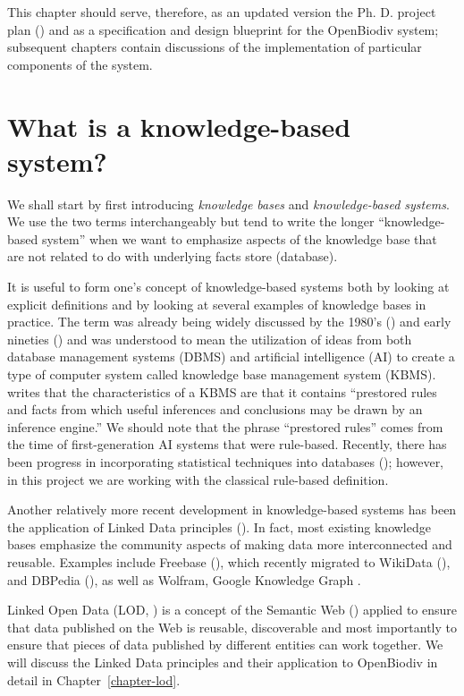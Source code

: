 This chapter should serve, therefore, as an updated version the Ph. D. project plan (\cite{senderov_open_2016}) and as a specification and design blueprint for the OpenBiodiv system; subsequent chapters contain discussions of the implementation of particular components of the system.

\section{What is a knowledge-based system?}

We shall start by first introducing \emph{knowledge bases} and \emph{knowledge-based systems}.  We use the two terms interchangeably but tend to write the longer  ``knowledge-based system'' when we want to emphasize aspects of the knowledge base that are not related to do with underlying facts store (database).

It is useful to form one's concept of knowledge-based systems both by looking at explicit definitions and by looking at several examples of knowledge bases in practice. The term was already being widely discussed by the 1980's (\cite{brodie_kbms_1989}) and early nineties (\cite{harris_knowledge_1993}) and was understood to mean the utilization of ideas from both database management systems (DBMS) and artificial intelligence (AI) to create a type of computer system called knowledge base management system (KBMS). \cite{harris_knowledge_1993} writes that the characteristics of a KBMS are that it contains ``prestored rules and facts from which useful inferences and conclusions may be drawn by an inference engine.''  We should note that the phrase ``prestored rules'' comes from the time of first-generation AI systems that were rule-based. Recently, there has been progress in incorporating statistical techniques into databases (\cite{mansinghka_bayesdb:_2015}); however, in this project we are working with the classical rule-based definition.

Another relatively more recent development in knowledge-based systems has been the application of Linked Data principles (\cite{heath_linked_2011}). In fact, most existing knowledge bases emphasize the community aspects of making data more interconnected and reusable. Examples include Freebase (\cite{bollacker_freebase:_2008}), which recently migrated to WikiData (\cite{vrandecic_wikidata:_2014, pellissier_tanon_freebase_2016}), and DBPedia (\cite{hutchison_dbpedia:_2007}), as well as Wolfram, Google Knowledge Graph .

Linked Open Data (LOD, \cite{heath_linked_2011}) is a concept of the Semantic Web (\cite{berners-lee_semantic_2001}) applied to ensure that data published on the Web is reusable, discoverable and most importantly to ensure that pieces of data published by different entities can work together.  We will discuss the Linked Data principles and their application to OpenBiodiv in detail in Chapter~\ref{chapter-lod}.

